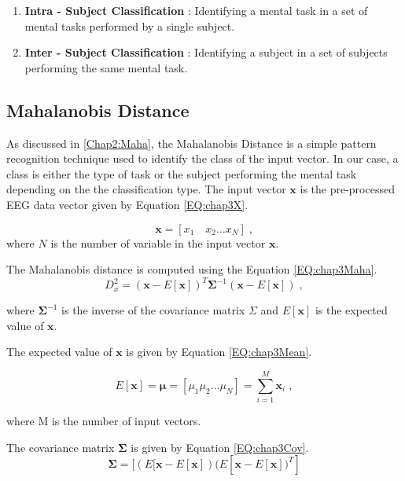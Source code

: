 		\begin{enumerate}
			\item \textbf{Intra - Subject Classification} : Identifying a mental task in a set of mental tasks performed by a single subject.
			\item \textbf{Inter - Subject Classification} : Identifying a subject in a set of subjects performing the same mental task.
		\end{enumerate}
        
\subsection{Mahalanobis Distance}
\label{Mahalanobis Distance}
	As discussed in \ref{Chap2:Maha}, the Mahalanobis Distance is a simple pattern recognition technique used to identify the class of the input vector. In our case, a class is either the type of task or the subject performing the mental task depending on the the classification type. The input vector $\mathbf{x}$ is the pre-processed EEG data vector given by Equation \ref{EQ:chap3X}.

	\begin{equation}
    	\mathbf{x} = [x_1\quad x_2 \ldots x_N] \;,
    	\label{EQ:chap3X}
    \end{equation}
    \noindent where $N$ is the number of variable in the input vector $\mathbf{x}$.
	
    The Mahalanobis distance is computed using the Equation \ref{EQ:chap3Maha}.
	\begin{equation}
    	D^2_x = (\mathbf{x} - E[\mathbf{x}])^T \bm{\Sigma}^{-1} (\mathbf{x} - E[\mathbf{x}]) \;,
    	\label{EQ:chap3Maha}
    \end{equation}
    
    \noindent where $\bm{\Sigma} ^{-1}$ is the inverse of the covariance matrix $\Sigma$ and $E[\mathbf{x}]$ is the expected value of $\mathbf{x}$.
    
    The expected value of $\mathbf{x}$ is given by Equation \ref{EQ:chap3Mean}.

	\begin{equation}
		E[\mathbf{x}] = \bm{\mu} = [\mu_1 \mu_2 \ldots \mu_N] = \sum_{i=1}^{M}\mathbf{x}_i \;,
    	\label{EQ:chap3Mean}
    \end{equation}
    
    \noindent where M is the number of input vectors.
    
    The covariance matrix $\bm{\Sigma}$ is given by Equation \ref{EQ:chap3Cov}.
	\begin{equation}
		\bm{\Sigma} = [(E[\mathbf{x} - E[\mathbf{x}])(E[\mathbf{x} - E[\mathbf{x}])^T ]
    	\label{EQ:chap3Cov}
    \end{equation}    
    
